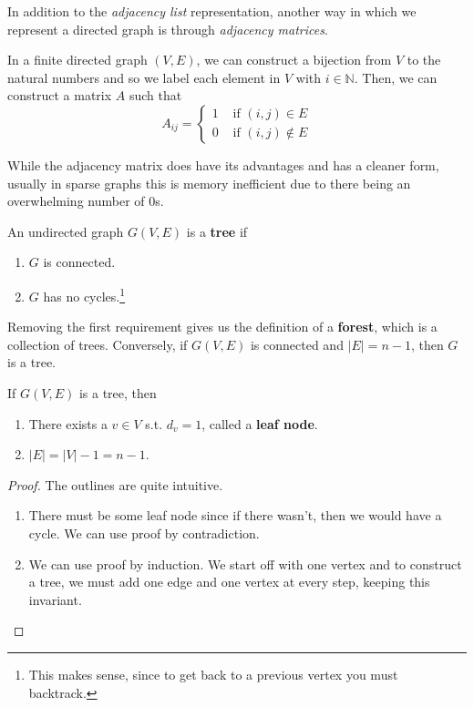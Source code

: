 \documentclass{article}
\begin{document}
    In addition to the \textit{adjacency list} representation, another way in which we represent a directed graph is through \textit{adjacency matrices}. 

    \begin{definition}
      In a finite directed graph $(V, E)$, we can construct a bijection from $V$ to the natural numbers and so we label each element in $V$ with $i \in \mathbb{N}$. Then, we can construct a matrix $A$ such that 
      \begin{equation}
        A_{ij} = \begin{cases} 1 & \text{ if } (i, j) \in E \\ 0 & \text{ if } (i, j) \not\in E \end{cases}
      \end{equation}
    \end{definition}

    While the adjacency matrix does have its advantages and has a cleaner form, usually in sparse graphs this is memory inefficient due to there being an overwhelming number of $0$s. 

    \begin{definition}[Trees]
      An undirected graph $G(V, E)$ is a \textbf{tree} if 
      \begin{enumerate}
        \item $G$ is connected. 
        \item $G$ has no cycles.\footnote{This makes sense, since to get back to a previous vertex you must backtrack.}
      \end{enumerate}
      Removing the first requirement gives us the definition of a \textbf{forest}, which is a collection of trees. Conversely, if $G(V, E)$ is connected  and $|E| = n - 1$, then $G$ is a tree. 
    \end{definition}

    \begin{theorem}
      If $G(V, E)$ is a tree, then 
      \begin{enumerate}
        \item There exists a $v \in V$ s.t. $d_v = 1$, called a \textbf{leaf node}. 
        \item $|E| = |V| - 1 = n - 1$. 
      \end{enumerate}
    \end{theorem}
    \begin{proof}
      The outlines are quite intuitive. 
      \begin{enumerate}
        \item There must be some leaf node since if there wasn't, then we would have a cycle. We can use proof by contradiction. 
        \item We can use proof by induction. We start off with one vertex and to construct a tree, we must add one edge and one vertex at every step, keeping this invariant.  
      \end{enumerate}
    \end{proof}
\end{document}
